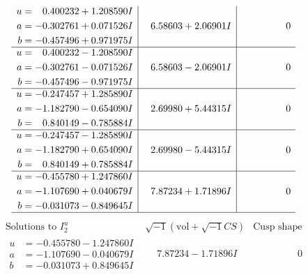 \documentclass[1p]{elsarticle_modified}
\theoremstyle{definition}
\newcommand{\I}{\sqrt{-1}}
\begin{document}
$$\begin{array}{c|c|c}
\begin{aligned}
u &= \phantom{-}0.400232 + 1.208590 I \\
a &= -0.302761 + 0.071526 I \\
b &= -0.457496 + 0.971975 I\end{aligned}
 & \phantom{-}6.58603 + 2.06901 I & \phantom{-0.000000 } 0 \\ \hline\begin{aligned}
u &= \phantom{-}0.400232 - 1.208590 I \\
a &= -0.302761 - 0.071526 I \\
b &= -0.457496 - 0.971975 I\end{aligned}
 & \phantom{-}6.58603 - 2.06901 I & \phantom{-0.000000 } 0 \\ \hline\begin{aligned}
u &= -0.247457 + 1.285890 I \\
a &= -1.182790 - 0.654090 I \\
b &= \phantom{-}0.840149 - 0.785884 I\end{aligned}
 & \phantom{-}2.69980 + 5.44315 I & \phantom{-0.000000 } 0 \\ \hline\begin{aligned}
u &= -0.247457 - 1.285890 I \\
a &= -1.182790 + 0.654090 I \\
b &= \phantom{-}0.840149 + 0.785884 I\end{aligned}
 & \phantom{-}2.69980 - 5.44315 I & \phantom{-0.000000 } 0 \\ \hline\begin{aligned}
u &= -0.455780 + 1.247860 I \\
a &= -1.107690 + 0.040679 I \\
b &= -0.031073 - 0.849645 I\end{aligned}
 & \phantom{-}7.87234 + 1.71896 I & \phantom{-0.000000 } 0\\
 \hline 
 \end{array}$$\newpage$$\begin{array}{c|c|c}  
\text{Solutions to }I^u_{2}& \I (\text{vol} + \sqrt{-1}CS) & \text{Cusp shape}\\
 \hline 
\begin{aligned}
u &= -0.455780 - 1.247860 I \\
a &= -1.107690 - 0.040679 I \\
b &= -0.031073 + 0.849645 I\end{aligned}
 & \phantom{-}7.87234 - 1.71896 I & \phantom{-0.000000 } 0 \\ \hline\begin{aligned}

\end{aligned}
\end{array}$$
\end{document}
